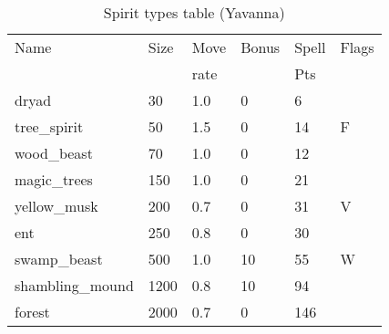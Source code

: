 \begin{same}
\begin{table}[hbpt]
\caption{Spirit types table (Yavanna)}
\begin{tabular}{ || l | l | l | l | l | l || }
\hline
Name            & Size &Move&Bonus&Spell&Flags\\
                &      &rate&     &Pts  &\\
\hline
dryad           &   30 & 1.0&   0 &   6 &\\
tree_spirit     &   50 & 1.5&   0 &  14 &F\\
wood_beast      &   70 & 1.0&   0 &  12 &\\
magic_trees     &  150 & 1.0&   0 &  21 &\\
yellow_musk     &  200 & 0.7&   0 &  31 &V\\
ent             &  250 & 0.8&   0 &  30 &\\
swamp_beast     &  500 & 1.0&  10 &  55 &W\\
shambling_mound & 1200 & 0.8&  10 &  94 &\\
forest          & 2000 & 0.7&   0 &  146 &\\
\hline
\end{tabular}
\end{table}
\end{same}



